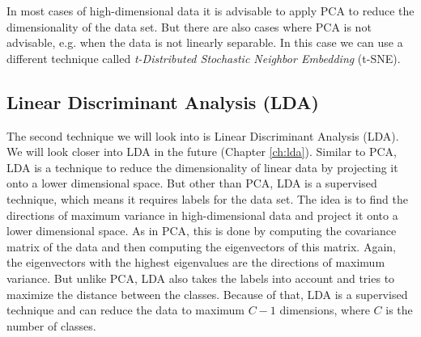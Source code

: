 In most cases of high-dimensional data it is advisable to apply PCA to reduce the dimensionality of the data set.
But there are also cases where PCA is not advisable, e.g. when the data is not linearly separable.
In this case we can use a different technique called \textit{t-Distributed Stochastic Neighbor Embedding} (t-SNE).
\subsection{Linear Discriminant Analysis (LDA)}
The second technique we will look into is Linear Discriminant Analysis (LDA). We will look closer into LDA in the future (Chapter \ref{ch:lda}).
Similar to PCA, LDA is a technique to reduce the dimensionality of linear data by projecting it onto a lower dimensional space.
But other than PCA, LDA is a supervised technique, which means it requires labels for the data set.
The idea is to find the directions of maximum variance in high-dimensional data and project it onto a lower dimensional space.
As in PCA, this is done by computing the covariance matrix of the data and then computing the eigenvectors of this matrix.
Again, the eigenvectors with the highest eigenvalues are the directions of maximum variance.
But unlike PCA, LDA also takes the labels into account and tries to maximize the distance between the classes.
Because of that, LDA is a supervised technique and can reduce the data to maximum $C - 1$ dimensions, where $C$ is the number of classes.
